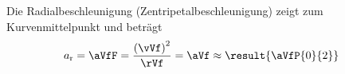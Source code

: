 Die Radialbeschleunigung (Zentripetalbeschleunigung) zeigt zum Kurvenmittelpunkt und beträgt
\begin{align}
 a_\mathrm{r} &= \aVfF = \frac{\left(\vVf\right)^2}{\rVf} = \aVf \approx \result{\aVfP{0}{2}}
\end{align}

